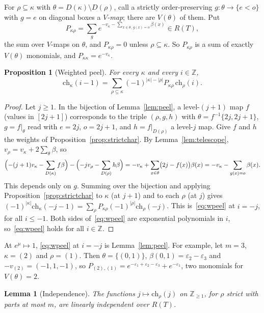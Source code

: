 \documentclass[11pt]{amsart}
\newtheorem{proposition}[theorem]{Proposition}
\newtheorem{lemma}[theorem]{Lemma}
\theoremstyle{definition}
\theoremstyle{remark}
\newcommand{\Z}{\mathbb{Z}}
\begin{document}
For $\rho\subseteq\kappa$ with $\theta=D(\kappa)\setminus D(\rho)$, call a strictly order-preserving
$g\colon\theta\to\{e<o\}$ with $g=e$ on diagonal boxes a \emph{$V$-map}; there are $V(\theta)$ of
them. Put
\[ P_{\kappa\rho}=\sum_{g}e^{-v_\kappa-\sum_{x\in\theta,\ g(x)=o}\beta(x)}\in R(T), \]
the sum over $V$-maps on $\theta$, and $P_{\kappa\rho}=0$ unless $\rho\subseteq\kappa$. So
$P_{\kappa\rho}$ is a sum of exactly $V(\theta)$ monomials, and $P_{\kappa\kappa}=e^{-v_\kappa}$.

\begin{proposition}[Weighted peel]\label{prop:wpeel}
For every $\kappa$ and every $i\in\Z$,
\begin{equation}\label{eq:wpeel}
\mathrm{ch}_\kappa(i-1)=\sum_{\rho\subseteq\kappa}(-1)^{|\kappa|-|\rho|}P_{\kappa\rho}\,\mathrm{ch}_\rho(i).
\end{equation}
\end{proposition}

\begin{proof}
Let $j\ge1$. In the bijection of Lemma~\ref{lem:peel}, a level-$(j+1)$ map $f$ (values in
$[2j+1]$) corresponds to the triple $(\rho,g,h)$ with $\theta=f^{-1}\{2j,2j+1\}$, $g=f|_\theta$ read
with $e=2j$, $o=2j+1$, and $h=f|_{D(\rho)}$ a level-$j$ map. Give $f$ and $h$ the weights of
Proposition~\ref{prop:strictchar}. By Lemma~\ref{lem:telescope}, $v_\rho=v_\kappa+2\sum_\theta\beta$, so
\[ \Bigl(-(j+1)v_\kappa-\sum_{D(\kappa)}f\beta\Bigr)-\Bigl(-jv_\rho-\sum_{D(\rho)}h\beta\Bigr)
=-v_\kappa+\sum_{x\in\theta}\bigl(2j-f(x)\bigr)\beta(x)=-v_\kappa-\sum_{g(x)=o}\beta(x). \]
This depends only on $g$. Summing over the bijection and applying
Proposition~\ref{prop:strictchar} to $\kappa$ (at $j+1$) and to each $\rho$ (at $j$) gives
$(-1)^{|\kappa|}\mathrm{ch}_\kappa(-j-1)=\sum_\rho P_{\kappa\rho}(-1)^{|\rho|}\mathrm{ch}_\rho(-j)$.
This is~\eqref{eq:wpeel} at $i=-j$, for all $i\le-1$. Both sides of~\eqref{eq:wpeel} are
exponential polynomials in $i$, so~\eqref{eq:wpeel} holds for all $i\in\Z$.
\end{proof}

At $e^\mu\mapsto1$, \eqref{eq:wpeel} at $i=-j$ is Lemma~\ref{lem:peel}. For example, let $m=3$,
$\kappa=(2)$ and $\rho=(1)$. Then $\theta=\{(0,1)\}$, $\beta(0,1)=\varepsilon_2-\varepsilon_3$ and
$-v_{(2)}=(-1,1,-1)$, so $P_{(2),(1)}=e^{-\varepsilon_1+\varepsilon_2-\varepsilon_3}+e^{-\varepsilon_1}$, two
monomials for $V(\theta)=2$.

\begin{lemma}[Independence]\label{lem:indep}
The functions $j\mapsto\mathrm{ch}_\rho(j)$ on $\Z_{\ge1}$, for $\rho$ strict with parts at most $m$, are
linearly independent over $R(T)$.
\end{lemma}
\end{document}
